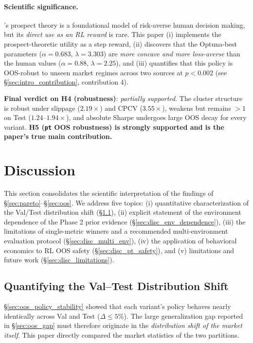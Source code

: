 \documentclass[11pt, a4paper]{article}
\begin{document}
\paragraph{Scientific significance.}
\citet{kahneman1979prospect}'s prospect theory is a foundational model of
risk-averse human decision making, but its \emph{direct use as an RL reward}
is rare. This paper (i) implements the prospect-theoretic utility as a
step reward, (ii) discovers that the Optuna-best parameters
($\alpha = 0.683$, $\lambda = 3.303$) are \emph{more concave and more
loss-averse} than the human values ($\alpha = 0.88$, $\lambda = 2.25$), and
(iii) quantifies that this policy is OOS-robust to unseen market regimes
across two sources at $p < 0.002$
(see \S\ref{sec:intro_contribution}, contribution 4).

\textbf{Final verdict on H4 (robustness)}: \emph{partially supported}. The
cluster structure is robust under slippage ($2.19\times$) and CPCV
($3.55\times$), weakens but remains $> 1$ on Test ($1.24$--$1.94\times$),
and absolute Sharpe undergoes large OOS decay for every variant.
\textbf{H5 (\texttt{pt} OOS robustness) is strongly supported and is the
paper's true main contribution.}

\section{Discussion}
\label{sec:discussion}

This section consolidates the scientific interpretation of the findings of
\S\ref{sec:pareto}--\S\ref{sec:oos}. We address five topics: (i) quantitative
characterization of the Val/Test distribution shift (\S\ref{sec:disc_shift}),
(ii) explicit statement of the environment dependence of the Phase 2
prior evidence (\S\ref{sec:disc_env_dependence}), (iii) the limitations
of single-metric winners and a recommended multi-environment evaluation
protocol (\S\ref{sec:disc_multi_env}), (iv) the application of behavioral
economics to RL OOS safety (\S\ref{sec:disc_pt_safety}), and (v) limitations
and future work (\S\ref{sec:disc_limitations}).

\subsection{Quantifying the Val--Test Distribution Shift}
\label{sec:disc_shift}

\S\ref{sec:oos_policy_stability} showed that each variant's policy behaves
nearly identically across Val and Test ($\Delta \leq 5\%$). The large
generalization gap reported in \S\ref{sec:oos_gap} must therefore originate in
the \emph{distribution shift of the market itself}. This paper directly
compared the market statistics of the two partitions.
\end{document}
